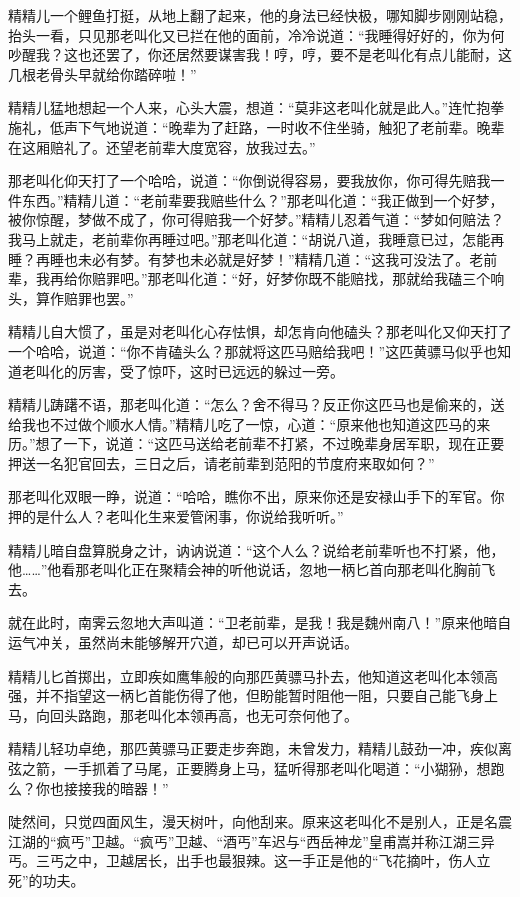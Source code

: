\documentclass[12pt,oneside]{book}
\begin{document}
精精儿一个鲤鱼打挺，从地上翻了起来，他的身法已经快极，哪知脚步刚刚站稳，抬头一看，只见那老叫化又已拦在他的面前，冷冷说道：``我睡得好好的，你为何吵醒我？这也还罢了，你还居然要谋害我！哼，哼，要不是老叫化有点儿能耐，这几根老骨头早就给你踏碎啦！''

精精儿猛地想起一个人来，心头大震，想道：``莫非这老叫化就是此人。''连忙抱拳施礼，低声下气地说道：``晚辈为了赶路，一时收不住坐骑，触犯了老前辈。晚辈在这厢赔礼了。还望老前辈大度宽容，放我过去。''

那老叫化仰天打了一个哈哈，说道：``你倒说得容易，要我放你，你可得先赔我一件东西。''精精儿道：``老前辈要我赔些什么？''那老叫化道：``我正做到一个好梦，被你惊醒，梦做不成了，你可得赔我一个好梦。''精精儿忍着气道：``梦如何赔法？我马上就走，老前辈你再睡过吧。''那老叫化道：``胡说八道，我睡意已过，怎能再睡？再睡也未必有梦。有梦也未必就是好梦！''精精几道：``这我可没法了。老前辈，我再给你赔罪吧。''那老叫化道：``好，好梦你既不能赔找，那就给我磕三个响头，算作赔罪也罢。''

精精儿自大惯了，虽是对老叫化心存怯惧，却怎肯向他磕头？那老叫化又仰天打了一个哈哈，说道：``你不肯磕头么？那就将这匹马赔给我吧！''这匹黄骠马似乎也知道老叫化的厉害，受了惊吓，这时已远远的躲过一旁。

精精儿踌躇不语，那老叫化道：``怎么？舍不得马？反正你这匹马也是偷来的，送给我也不过做个顺水人情。''精精儿吃了一惊，心道：``原来他也知道这匹马的来历。''想了一下，说道：``这匹马送给老前辈不打紧，不过晚辈身居军职，现在正要押送一名犯官回去，三日之后，请老前辈到范阳的节度府来取如何？''

那老叫化双眼一睁，说道：``哈哈，瞧你不出，原来你还是安禄山手下的军官。你押的是什么人？老叫化生来爱管闲事，你说给我听听。''

精精儿暗自盘算脱身之计，讷讷说道：``这个人么？说给老前辈听也不打紧，他，他\ldots\ldots{}''他看那老叫化正在聚精会神的听他说话，忽地一柄匕首向那老叫化胸前飞去。

就在此时，南霁云忽地大声叫道：``卫老前辈，是我！我是魏州南八！''原来他暗自运气冲关，虽然尚未能够解开穴道，却已可以开声说话。

精精儿匕首掷出，立即疾如鹰隼般的向那匹黄骠马扑去，他知道这老叫化本领高强，并不指望这一柄匕首能伤得了他，但盼能暂时阻他一阻，只要自己能飞身上马，向回头路跑，那老叫化本领再高，也无可奈何他了。

精精儿轻功卓绝，那匹黄骠马正要走步奔跑，未曾发力，精精儿鼓劲一冲，疾似离弦之箭，一手抓着了马尾，正要腾身上马，猛听得那老叫化喝道：``小猢狲，想跑么？你也接接我的暗器！''

陡然间，只觉四面风生，漫天树叶，向他刮来。原来这老叫化不是别人，正是名震江湖的``疯丐''卫越。``疯丐''卫越、``酒丐''车迟与``西岳神龙''皇甫嵩并称江湖三异丐。三丐之中，卫越居长，出手也最狠辣。这一手正是他的``飞花摘叶，伤人立死''的功夫。
\end{document}
